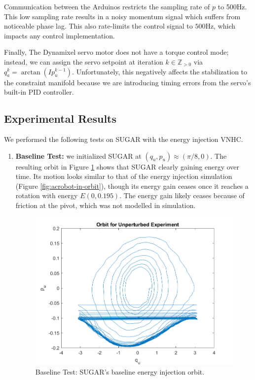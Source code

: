 \documentclass[journal,twoside,web]{ieeecolor}
\begin{document}
{Communication between the Arduinos restricts the sampling rate of \(p\) to
500Hz.
This low sampling rate results in a noisy momentum signal which suffers
from noticeable phase lag.
This also rate-limits the control signal to \(500\)Hz, which impacts any control
implementation.

Finally, The Dynamixel servo motor does not have a torque control mode; instead,
we can assign the servo setpoint at iteration \(k \in \mathbb{Z}_{> 0}\)
via \(q_a^{k} = \arctan(I p_u^{k-1})\).
Unfortunately, this negatively affects the stabilization to the constraint
manifold because we are introducing timing errors from the servo's built-in PID
controller.

\subsection{Experimental Results}

We performed the following tests on SUGAR with the energy injection VNHC.

\begin{enumerate}
    \item \textbf{Baseline Test:} 
    we initialized SUGAR at 
    \((q_u,p_u) \approx \left(\pi/8,0\right)\). 
    The resulting orbit in Figure \ref{fig:acrobot-unperturbed-orbit} shows
    that SUGAR clearly gaining energy over time.
    Its motion looks similar to that of the energy injection simulation (Figure
    \ref{fig:acrobot-in-orbit}), though its energy gain ceases once it reaches a
    rotation with energy \(E(0,0.195)\).
    The energy gain likely ceases because of friction at the pivot, which was
    not modelled in simulation.

\begin{figure}
    \centering
    \includegraphics[width=0.8\linewidth]{acrobot_unperturbed_orbit.png}
    \caption{Baseline Test: SUGAR's baseline energy injection orbit.}
    \label{fig:acrobot-unperturbed-orbit}
\end{figure}


\end{enumerate}}
\end{document}
